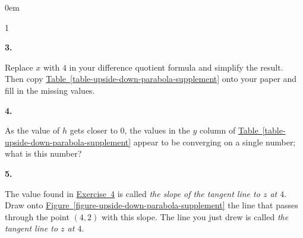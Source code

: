 \documentclass[12pt,]{book}
\theoremstyle{plain}
\theoremstyle{definition}
\numberwithin{equation}{section}
\newenvironment{exercisegroup}%
{\medskip\noindent}%
{\par\bigskip}%
\newlength{\exercisegroupindent}%
\newlength{\exercisegroupitemwidth}%
\newenvironment{exercisegrouplist}%
{\vspace{-\partopsep}%
\begin{adjustwidth}{\exercisegroupindent}{0em}}%
{\end{adjustwidth}%
\vspace{-\partopsep}%
\vspace{\baselineskip}}%
\newenvironment{exercisegroupbycol}[1]%
{\begin{exercisegrouplist}%
\vspace{-\multicolsep}%
\begin{multicols}{#1}%
\setlength{\parindent}{0em}%
\setlength{\exercisegroupitemwidth}{\linewidth}}%
{\end{multicols}%
\vspace{-\multicolsep}%
\end{exercisegrouplist}}%
\newenvironment{exercisegroupitem}[1]%
{\begin{minipage}[t]{\exercisegroupitemwidth}
\vspace{0pt}%
{\bfseries#1}%
\rule{0pt}{\baselineskip}}{\strut%
\end{minipage}%
\hspace{\columnsep}}%
\providecommand\phantomsection{}
\newcommand{\point}[2]{\left(#1,#2\right)}
\begin{document}
\begin{exercisegroup}
\begin{exercisegroupbycol}{1}
\begin{exercisegroupitem}{3. }\phantomsection\hypertarget{exercise-32}{\null}
Replace \(x\) with \(4\) in your difference quotient formula and simplify the result.  Then copy \hyperref[table-upside-down-parabola-supplement]{Table~\ref*{table-upside-down-parabola-supplement}} onto your paper and fill in the missing values.%
\end{exercisegroupitem}%
\par%
\begin{exercisegroupitem}{4. }\phantomsection\hypertarget{exercise-upside-down-parabola-slope}{\null}
As the value of \(h\) gets closer to \(0\), the values in the \(y\) column of \hyperref[table-upside-down-parabola-supplement]{Table~\ref*{table-upside-down-parabola-supplement}} appear to be converging on a single number; what is this number?%
\end{exercisegroupitem}%
\par%
\begin{exercisegroupitem}{5. }\phantomsection\hypertarget{exercise-34}{\null}
The value found in \hyperref[exercise-upside-down-parabola-slope]{Exercise~4} is called \emph{the slope of the tangent line to \(z\) at \(4\)}.  Draw onto \hyperref[figure-upside-down-parabola-supplement]{Figure~\ref*{figure-upside-down-parabola-supplement}} the line that passes through the point \(\point{4}{2}\) with this slope.  The line you just drew is called \emph{the tangent line to \(z\) at \(4\)}.%
\end{exercisegroupitem}%
\par%
\end{exercisegroupbycol}%
\end{exercisegroup}%
\end{document}
